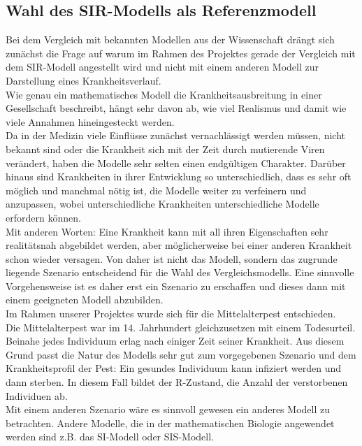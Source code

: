 \subsection*{Wahl des SIR-Modells als Referenzmodell}

Bei dem Vergleich mit bekannten Modellen aus der Wissenschaft drängt sich zunächst die Frage auf warum im Rahmen des Projektes gerade der Vergleich mit dem SIR-Modell angestellt wird und nicht mit einem anderen Modell zur Darstellung eines Krankheitsverlauf.\\
Wie genau ein mathematisches Modell die Krankheitsausbreitung in einer Gesellschaft beschreibt, hängt sehr davon ab, wie viel Realismus und damit wie viele Annahmen hineingesteckt werden.\\
Da in der Medizin viele Einflüsse zunächst vernachlässigt werden müssen, nicht bekannt sind oder die Krankheit sich mit der Zeit durch mutierende Viren verändert, haben die Modelle sehr selten einen endgültigen Charakter. Darüber hinaus sind Krankheiten in ihrer Entwicklung so unterschiedlich, dass es sehr oft möglich und manchmal nötig ist, die Modelle weiter zu verfeinern und anzupassen, wobei unterschiedliche Krankheiten unterschiedliche Modelle erfordern können. 
\cite{sebM}\\
Mit anderen Worten: Eine Krankheit kann mit all ihren Eigenschaften sehr realitätsnah abgebildet werden, aber möglicherweise bei einer anderen Krankheit schon wieder versagen. Von daher ist nicht das Modell, sondern das zugrunde liegende Szenario entscheidend für die Wahl des Vergleichsmodells. Eine sinnvolle Vorgehensweise ist es daher erst ein Szenario zu erschaffen und dieses dann mit einem geeigneten Modell abzubilden.\\ 
Im Rahmen unserer Projektes wurde sich für die Mittelalterpest entschieden.\\ 
Die Mittelalterpest war im 14. Jahrhundert gleichzusetzen mit einem Todesurteil. Beinahe jedes Individuum erlag nach einiger Zeit seiner Krankheit. Aus diesem Grund passt die Natur des Modells sehr gut zum vorgegebenen Szenario und dem Krankheitsprofil der Pest: Ein gesundes Individuum kann infiziert werden und dann sterben. In diesem Fall bildet der \glqq R\grqq-Zustand, die Anzahl der verstorbenen Individuen ab.\\
Mit einem anderen Szenario wäre es sinnvoll gewesen ein anderes Modell zu betrachten. 
Andere Modelle, die in der mathematischen Biologie angewendet werden sind z.B. das SI-Modell oder SIS-Modell.\\

